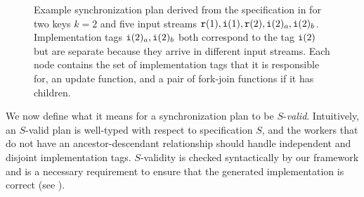 \begin{figure}
\scalebox{0.8}{
\begin{tikzpicture}[sibling distance=11em,
  every node/.style = {shape=rectangle,
    rounded corners,
    draw, align=center}]]
  \node { \TopConfigNode{$w_1$}{}{update -- $\langle$ fork, join $\rangle$} }
    child { \ConfigurationNode{$w_2$}{$\tg{r}(1), \tg{i}(1)$}{update} }
    child { \ConfigurationNode{$w_3$}{$\tg{r}(2)$}{update -- $\langle$ fork, join $\rangle$}
        child { \ConfigurationNode{$w_4$}{$\tg{i}(2)_a$}{update} }
        child { \ConfigurationNode{$w_5$}{$\tg{i}(2)_b$}{update} } };
\end{tikzpicture}
}
\caption{Example synchronization plan derived from the
  specification in  for two keys $k=2$ and
  five input streams $\texttt{r}(1), \texttt{i}(1), \texttt{r}(2), \texttt{i}(2)_a, \texttt{i}(2)_b$. 
  Implementation tags $\texttt{i}(2)_a, \texttt{i}(2)_b$ both correspond to the tag $\texttt{i}(2)$ but are separate because they arrive in different input streams.
  Each node contains the set of implementation tags that it is responsible for,
  an update function, and a pair of fork-join
  functions if it has children.
  }
\label{fig:example-configuration}
\end{figure}


We now define what it means for a synchronization plan to be $S$-\emph{valid}.
Intuitively, an $S$-valid plan is well-typed with respect to specification $S$,
  and the workers that do not have an ancestor-descendant relationship should handle independent and disjoint implementation tags.
$S$-validity is checked syntactically by our framework
  and is a necessary requirement to ensure that the generated implementation is correct (see ).


